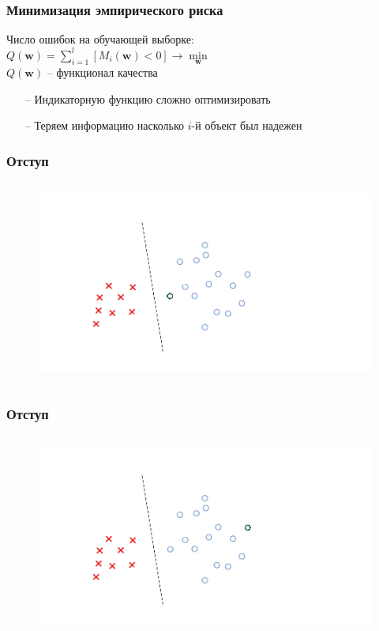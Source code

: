 \documentclass[10pt]{beamer}
\begin{document}
\begin{frame}\frametitle{Минимизация эмпирического риска}
	Число ошибок на обучающей выборке:\\
	\bigbreak
	${Q(\mathbf{w}) = \sum\limits_{i=1}^l \left[ M_i(\mathbf{w}) < 0 \right] \rightarrow \min\limits_{\mathbf{w}} }$\\
	\bigbreak
	${Q(\mathbf{w})}$ -- функционал качества\\
	\bigbreak
  \begin{itemize}
		\item[--] Индикаторную функцию сложно оптимизировать
		\item[--] Теряем информацию насколько ${i}$-й объект был надежен
	\end{itemize}
\end{frame}

\begin{frame}\frametitle{Отступ}
	\begin{figure}[htbp]
	  \includegraphics[height=190pt, keepaspectratio = true]{images/margin1}
	\end{figure}
\end{frame}

\begin{frame}\frametitle{Отступ}
	\begin{figure}[htbp]
	  \includegraphics[height=190pt, keepaspectratio = true]{images/margin2}
	\end{figure}
\end{frame}
\end{document}
